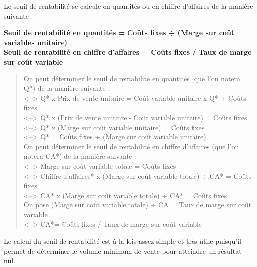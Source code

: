 \documentclass{tufte-handout}
\begin{document}
\begin{enumerate}
Le seuil de rentabilité se calcule en quantités ou en chiffre d'affaires de la manière suivante :\\
\begin{center}
\textbf{Seuil de rentabilité en quantités  =  Coûts fixes ÷ (Marge sur coût variables unitaire)}\\
\textbf{Seuil de rentabilité en chiffre d'affaires = Coûts fixes / Taux de marge sur coût variable}\\
\end{center}

\begin{quote}
On peut déterminer le seuil de rentabilité en quantités (que l'on notera Q*) de la manière suivante :\\
<--> Q* x Prix de vente unitaire = Coût variable unitaire x Q* + Coûts fixes\\
<--> Q* x (Prix de vente unitaire - Coût variable unitaire) =  Coûts fixes\\
<--> Q* x (Marge sur coût variable unitaire) =  Coûts fixes\\
<--> Q* =  Coûts fixes ÷ (Marge sur coût variable unitaire)\\
On peut déterminer le seuil de rentabilité en chiffre d'affaires (que l'on notera CA*) de la manière suivante :\\
<--> Marge sur coût variable totale =  Coûts fixes\\
<--> Chiffre d'affaires* x (Marge sur coût variable totale) ÷ CA* =  Coûts fixes\\
<--> CA* x (Marge sur coût variable totale) ÷ CA* =  Coûts fixes\\
On pose (Marge sur coût variable totale) ÷ CA = Taux de marge sur coût variable\\
<--> CA*= Coûts fixes / Taux de marge sur coût variable\\
\end{quote}

Le calcul du seuil de rentabilité est à la fois assez simple et très utile puisqu'il permet de déterminer le volume minimum de vente pour atteindre un résultat nul.\\


\end{enumerate}
\end{document}
